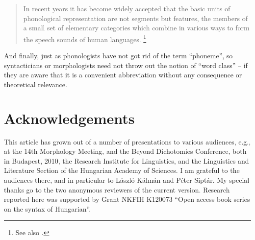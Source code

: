 \documentclass[output=paper]{langsci/langscibook}
\begin{document}
\begin{quote}

In recent years it has become widely accepted that the basic units of
phonological representation are not segments but features, the members of a
small set of elementary categories which combine in
various ways to form the speech sounds of human languages.
\parencite[245]{ClementsHume1995}\footnote{See also \citet{Siptár2006}.}

\end{quote}

And finally, just as phonologists have not got rid of the term
\enquote{phoneme}, so syntacticians or morphologists need not throw out the
notion of \enquote{word class} -- if they are aware that it is a convenient
abbreviation without any consequence or theoretical relevance.

\printchapterglossary{}

\section*{Acknowledgements}

This article has grown out of a number of presentations to various audiences,
e.g., at the 14th Morphology Meeting, and the Beyond Dichotomies Conference,
both in Budapest, 2010, the Research Institute for Linguistics, and the
Linguistics and Literature Section of the Hungarian Academy of Sciences. I am
grateful to the audiences there, and in particular to László Kálmán and Péter
Siptár. My special thanks go to the two anonymous reviewers of the current
version.  Research reported here was supported by Grant NKFIH K120073
\enquote{Open access book series on the syntax of Hungarian}.

{\sloppy
\printbibliography[heading=subbibliography,notkeyword=this]
}
\end{document}
